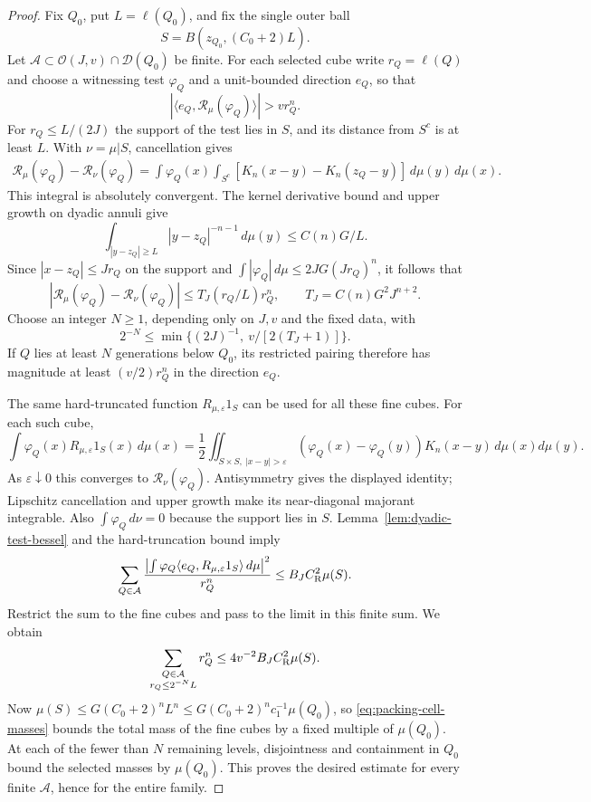 \begin{proof}
Fix $Q_0$, put $L=\ell(Q_0)$, and fix the single outer ball
\[
 S=B(z_{Q_0},(C_0+2)L).
\]
Let $\mathcal A\subset\mathcal O(J,v)\cap\mathcal D(Q_0)$ be finite.
For each selected cube write $r_Q=\ell(Q)$ and choose a witnessing test
$\varphi_Q$ and a unit-bounded direction $e_Q$, so that
\[
 |\langle e_Q,\mathcal R_\mu(\varphi_Q)\rangle|>vr_Q^n.
\]
For $r_Q\le L/(2J)$ the support of the test lies in $S$, and its distance
from $S^c$ is at least $L$. With $\nu=\mu|S$, cancellation gives
\begin{align*}
 \mathcal R_\mu(\varphi_Q)-\mathcal R_\nu(\varphi_Q)
 =\int\varphi_Q(x)\int_{S^c}
 [K_n(x-y)-K_n(z_Q-y)]\,d\mu(y)\,d\mu(x).
\end{align*}
This integral is absolutely convergent. The kernel derivative bound and
upper growth on dyadic annuli give
\[
 \int_{|y-z_Q|\ge L}|y-z_Q|^{-n-1}\,d\mu(y)
 \le C(n)G/L.
\]
Since $|x-z_Q|\le Jr_Q$ on the support and
$\int|\varphi_Q|\,d\mu\le2JG(Jr_Q)^n$, it follows that
\begin{equation}\label{eq:oscillation-outer-error}
 |\mathcal R_\mu(\varphi_Q)-\mathcal R_\nu(\varphi_Q)|
 \le T_J(r_Q/L)r_Q^n,
 \qquad T_J=C(n)G^2J^{n+2}.
\end{equation}
Choose an integer $N\ge1$, depending only on $J,v$ and the fixed data,
with
\[
 2^{-N}\le\min\{(2J)^{-1},\ v/[2(T_J+1)]\}.
\]
If $Q$ lies at least $N$ generations below $Q_0$, its restricted pairing
therefore has magnitude at least $(v/2)r_Q^n$ in the direction $e_Q$.

The same hard-truncated function $R_{\mu,\varepsilon}1_S$ can be used for
all these fine cubes. For each such cube,
\[
 \int\varphi_Q(x)R_{\mu,\varepsilon}1_S(x)\,d\mu(x)
 =\frac12\iint_{S\times S,\ |x-y|>\varepsilon}
  (\varphi_Q(x)-\varphi_Q(y))K_n(x-y)\,d\mu(x)d\mu(y).
\]
As $\varepsilon\downarrow0$ this converges to
$\mathcal R_\nu(\varphi_Q)$. Antisymmetry gives the displayed identity;
Lipschitz cancellation and upper growth make its near-diagonal majorant
integrable. Also $\int\varphi_Q\,d\nu=0$ because the support lies in $S$.
Lemma~\ref{lem:dyadic-test-bessel} and the hard-truncation bound imply
\[
 \sum_{Q\in\mathcal A}
 \frac{\left|\int\varphi_Q\langle e_Q,
                R_{\mu,\varepsilon}1_S\rangle\,d\mu\right|^2}{r_Q^n}
 \le B_J C_{\rm R}^2\mu(S).
\]
Restrict the sum to the fine cubes and pass to the limit in this finite
sum. We obtain
\[
 \sum_{\substack{Q\in\mathcal A\\r_Q\le2^{-N}L}}r_Q^n
 \le4v^{-2}B_JC_{\rm R}^2\mu(S).
\]
Now $\mu(S)\le G(C_0+2)^nL^n\le
G(C_0+2)^nc_1^{-1}\mu(Q_0)$, so
\eqref{eq:packing-cell-masses} bounds the total mass of the fine cubes
by a fixed multiple of $\mu(Q_0)$. At each of the fewer than $N$ remaining
levels, disjointness and containment in $Q_0$ bound the selected masses
by $\mu(Q_0)$. This proves the desired estimate for every finite
$\mathcal A$, hence for the entire family.
\end{proof}

